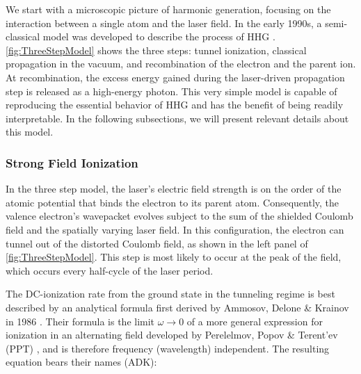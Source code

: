 We start with a microscopic picture of harmonic generation, focusing on the interaction between a single atom and the laser field. In the early 1990s, a semi-classical model was developed to describe the process of HHG \cite{schaferThresholdIonizationHigh1993,corkumPlasmaPerspectiveStrong1993}. \cref{fig:ThreeStepModel} shows the three steps: tunnel ionization, classical propagation in the vacuum, and recombination of the electron and the parent ion. At recombination, the excess energy gained during the laser-driven propagation step is released as a high-energy photon. This very simple model is capable of reproducing the essential behavior of HHG and has the benefit of being readily interpretable. In the following subsections, we will present relevant details about this model.

\subsubsection{Strong Field Ionization}

In the three step model, the laser's electric field strength is on the order of the atomic potential that binds the electron to its parent atom. Consequently, the valence electron's wavepacket evolves subject to the sum of the shielded Coulomb field and the spatially varying laser field. In this configuration, the electron can tunnel out of the distorted Coulomb field, as shown in the left panel of \cref{fig:ThreeStepModel}. This step is most likely to occur at the peak of the field, which occurs every half-cycle of the laser period.

The DC-ionization rate from the ground state in the tunneling regime is best described by an analytical formula first derived by Ammosov, Delone \& Krainov in 1986 \cite{ammosovTunnelIonizationComplex1986,changFundamentalsAttosecondOptics2011,laiExperimentalInvestigationStrongfieldionization2017}. Their formula is the limit $\omega \rightarrow 0$ of a more general expression for ionization in an alternating field developed by Perelelmov, Popov \& Terent'ev (PPT) \cite{perelomovIONIZATIONATOMSALTERNATING1966}, and is therefore frequency (wavelength) independent. The resulting equation bears their names (ADK):

